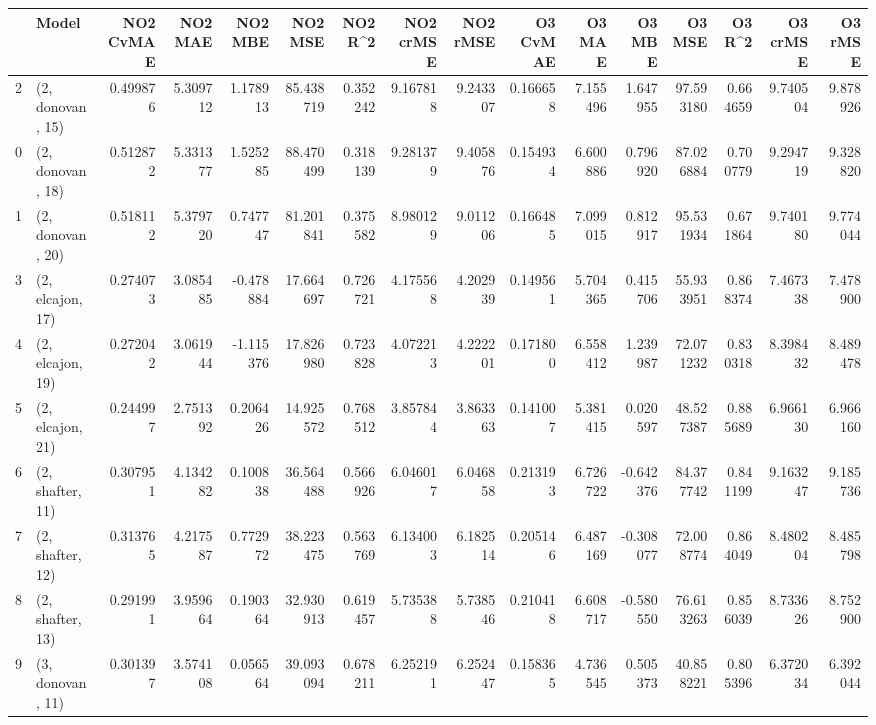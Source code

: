 \begin{tabular}{llrrrrrrrrrrrrrr}
\toprule
{} &             Model &  NO2 CvMAE &   NO2 MAE &   NO2 MBE &     NO2 MSE &   NO2 R\textasciicircum2 &  NO2 crMSE &   NO2 rMSE &  O3 CvMAE &    O3 MAE &    O3 MBE &      O3 MSE &    O3 R\textasciicircum2 &   O3 crMSE &    O3 rMSE \\
\midrule
2  &  (2, donovan, 15) &   0.499876 &  5.309712 &  1.178913 &   85.438719 &  0.352242 &   9.167818 &   9.243307 &  0.166658 &  7.155496 &  1.647955 &   97.593180 &  0.664659 &   9.740504 &   9.878926 \\
0  &  (2, donovan, 18) &   0.512872 &  5.331377 &  1.525285 &   88.470499 &  0.318139 &   9.281379 &   9.405876 &  0.154934 &  6.600886 &  0.796920 &   87.026884 &  0.700779 &   9.294719 &   9.328820 \\
1  &  (2, donovan, 20) &   0.518112 &  5.379720 &  0.747747 &   81.201841 &  0.375582 &   8.980129 &   9.011206 &  0.166485 &  7.099015 &  0.812917 &   95.531934 &  0.671864 &   9.740180 &   9.774044 \\
3  &  (2, elcajon, 17) &   0.274073 &  3.085485 & -0.478884 &   17.664697 &  0.726721 &   4.175568 &   4.202939 &  0.149561 &  5.704365 &  0.415706 &   55.933951 &  0.868374 &   7.467338 &   7.478900 \\
4  &  (2, elcajon, 19) &   0.272042 &  3.061944 & -1.115376 &   17.826980 &  0.723828 &   4.072213 &   4.222201 &  0.171800 &  6.558412 &  1.239987 &   72.071232 &  0.830318 &   8.398432 &   8.489478 \\
5  &  (2, elcajon, 21) &   0.244997 &  2.751392 &  0.206426 &   14.925572 &  0.768512 &   3.857844 &   3.863363 &  0.141007 &  5.381415 &  0.020597 &   48.527387 &  0.885689 &   6.966130 &   6.966160 \\
6  &  (2, shafter, 11) &   0.307951 &  4.134282 &  0.100838 &   36.564488 &  0.566926 &   6.046017 &   6.046858 &  0.213193 &  6.726722 & -0.642376 &   84.377742 &  0.841199 &   9.163247 &   9.185736 \\
7  &  (2, shafter, 12) &   0.313765 &  4.217587 &  0.772972 &   38.223475 &  0.563769 &   6.134003 &   6.182514 &  0.205146 &  6.487169 & -0.308077 &   72.008774 &  0.864049 &   8.480204 &   8.485798 \\
8  &  (2, shafter, 13) &   0.291991 &  3.959664 &  0.190364 &   32.930913 &  0.619457 &   5.735388 &   5.738546 &  0.210418 &  6.608717 & -0.580550 &   76.613263 &  0.856039 &   8.733626 &   8.752900 \\
9  &  (3, donovan, 11) &   0.301397 &  3.574108 &  0.056564 &   39.093094 &  0.678211 &   6.252191 &   6.252447 &  0.158365 &  4.736545 &  0.505373 &   40.858221 &  0.805396 &   6.372034 &   6.392044 \\

\end{tabular}
